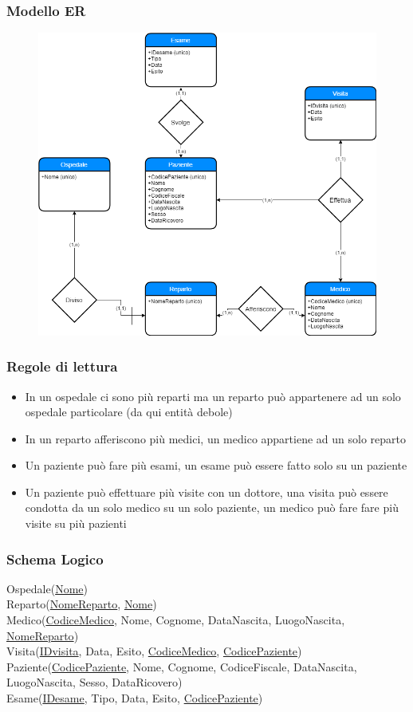\documentclass{article}
\begin{document}
	\subsubsection{Modello ER}
	\begin{figure}[h!]
		\centering
		\includegraphics[scale=0.5]{images/Ospedale.png}
	\end{figure}
	\subsubsection{Regole di lettura}
	\begin{itemize}
		\item In un ospedale ci sono più reparti ma un reparto può appartenere ad un solo ospedale particolare (da qui entità debole)
		\item In un reparto afferiscono più medici, un medico appartiene ad un solo reparto
		\item Un paziente può fare più esami, un esame può essere fatto solo su un paziente
		\item Un paziente può effettuare più visite con un dottore, una visita può essere condotta da un solo medico su un solo paziente, un medico può fare fare più visite su più pazienti
	\end{itemize}
	\subsubsection{Schema Logico}
	Ospedale(\underline{Nome})\\
	Reparto(\underline{NomeReparto}, \underline{Nome})\\
	Medico(\underline{CodiceMedico}, Nome, Cognome, DataNascita, LuogoNascita, \underline{NomeReparto})\\
	Visita(\underline{IDvisita}, Data, Esito, \underline{CodiceMedico}, \underline{CodicePaziente})\\
	Paziente(\underline{CodicePaziente}, Nome, Cognome, CodiceFiscale, DataNascita, LuogoNascita, Sesso, DataRicovero)\\
	Esame(\underline{IDesame}, Tipo, Data, Esito, \underline{CodicePaziente})
\end{document}
